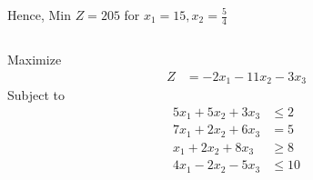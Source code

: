 \documentclass[12pt]{article}
\begin{document}
Hence, Min $Z=205$ for $x_1=15, x_2 = \frac{5}{4}$

\subsection{}
Maximize
\begin{align*}
Z                    & = -2x_{1}-11x_{2}-3x_{3}
\end{align*}
Subject to
\begin{align*}
5x_{1}+5x_{2}+3x_{3} & \le 2                                                                                                                                                                                                                         \\
7x_{1}+2x_{2}+6x_{3} & = 5                                                                                                                                                                                                                           \\
x_{1}+2x_{2}+8x_{3}  & \ge 8                                                                                                                                                                                                                         \\
4x_{1}-2x_{2}-5x_{3} & \le 10                                                                                                                                                                                                                        \\
\end{align*}
\end{document}
